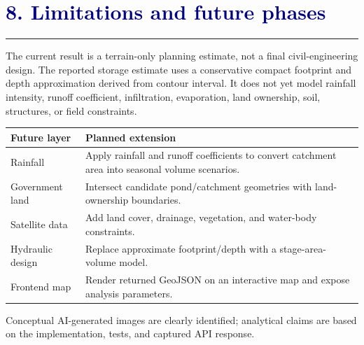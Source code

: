 \documentclass[11pt,a4paper]{article}
\newcommand{\sectionrule}{\textcolor{teal}{\rule{\linewidth}{1.2pt}}}
\newcommand{\reportsection}[1]{\section*{\textcolor{navy}{#1}}\sectionrule\vspace{4pt}}
\begin{document}
\newpage
\reportsection{8. Limitations and future phases}
The current result is a terrain-only planning estimate, not a final civil-engineering design. The reported storage estimate uses a conservative compact footprint and depth approximation derived from contour interval. It does not yet model rainfall intensity, runoff coefficient, infiltration, evaporation, land ownership, soil, structures, or field constraints.

\begin{tabularx}{\linewidth}{@{}p{35mm}X@{}}
\toprule
\textbf{Future layer} & \textbf{Planned extension}\\
\midrule
Rainfall & Apply rainfall and runoff coefficients to convert catchment area into seasonal volume scenarios.\\
Government land & Intersect candidate pond/catchment geometries with land-ownership boundaries.\\
Satellite data & Add land cover, drainage, vegetation, and water-body constraints.\\
Hydraulic design & Replace approximate footprint/depth with a stage-area-volume model.\\
Frontend map & Render returned GeoJSON on an interactive map and expose analysis parameters.\\
\bottomrule
\end{tabularx}

\vfill
\begin{center}
\textcolor{muted}{\small Conceptual AI-generated images are clearly identified; analytical claims are based on the implementation, tests, and captured API response.}
\end{center}
\end{document}
